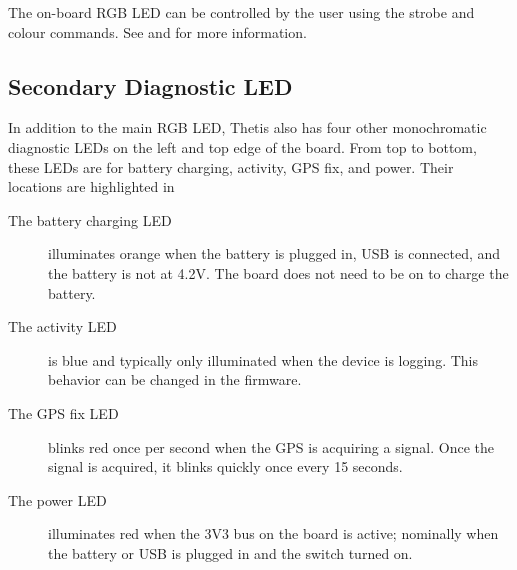 The on-board \ac{RGB} \ac{LED} can be controlled by the user using the strobe and colour commands.  
See  and  for more information.

\subsection{Secondary Diagnostic \acs{LED}}
In addition to the main \ac{RGB} \ac{LED}, Thetis also has four other monochromatic diagnostic \acp{LED} on the left and top edge of the board.
From top to bottom, these \acp{LED} are for battery charging, activity, GPS fix, and power.
Their locations are highlighted in 


\begin{description}
    \item[The battery charging \ac{LED}] illuminates orange when the battery is plugged in, \ac{USB} is connected, and the battery is not at 4.2V. The board does not need to be on to charge the battery.
    \item[The activity \ac{LED}] is blue and typically only illuminated when the device is logging. This behavior can be changed in the firmware.   
    \item[The \ac{GPS} fix \ac{LED}] blinks red once per second when the GPS is acquiring a signal. Once the signal is acquired, it blinks quickly once every 15 seconds.
    \item[The power \ac{LED}] illuminates red when the 3V3 bus on the board is active; nominally when the battery or \ac{USB} is plugged in and the switch turned on.
\end{description}
